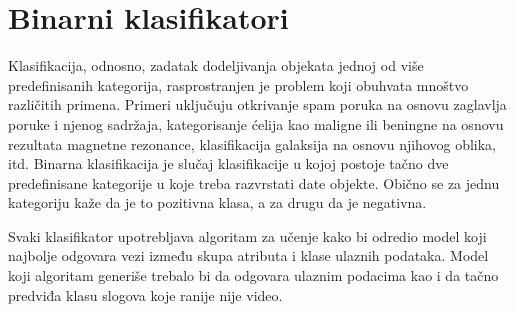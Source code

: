 \section{Binarni klasifikatori}

Klasifikacija, odnosno, zadatak dodeljivanja objekata jednoj od više predefinisanih kategorija, rasprostranjen je problem koji obuhvata mnoštvo različitih primena. Primeri uključuju otkrivanje spam poruka na osnovu zaglavlja poruke i njenog sadržaja, kategorisanje ćelija kao maligne ili beningne na osnovu rezultata magnetne rezonance, klasifikacija galaksija na osnovu njihovog oblika, itd. Binarna klasifikacija je slučaj klasifikacije u kojoj postoje tačno dve predefinisane kategorije u koje treba razvrstati date objekte. Obično se za jednu kategoriju kaže da je to pozitivna klasa, a za drugu da je negativna.

Svaki klasifikator upotrebljava algoritam za učenje kako bi odredio model koji najbolje odgovara vezi između skupa atributa i klase ulaznih podataka. Model koji algoritam generiše trebalo bi da odgovara ulaznim podacima kao i da tačno predviđa klasu slogova koje ranije nije video. 

